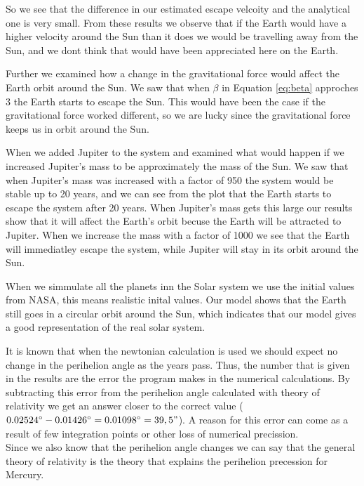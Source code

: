 \documentclass{article}
\begin{document}
So we see that the difference in our estimated escape velcoity and the analytical one is very small. From these results we observe that if the Earth would have a higher velocity around the Sun than it does we would be travelling away from the Sun, and we dont think that would have been appreciated here on the Earth.

Further we examined how a change in the gravitational force would affect the Earth orbit around the Sun. We saw that when $\beta$ in Equation \ref{eq:beta} approches 3 the Earth starts to escape the Sun. This would have been the case if the gravitational force worked different, so we are lucky since the gravitational force keeps us in orbit around the Sun.

When we added Jupiter to the system and examined what would happen if we increased Jupiter's mass to be approximately the mass of the Sun. We saw that when Jupiter's mass was increased with a factor of 950 the system would be stable up to 20 years, and we can see from the plot that the Earth starts to escape the system after 20 years. When Jupiter's mass gets this large our results show that it will affect the Earth's orbit becuse the Earth will be attracted to Jupiter. When we increase the mass with a factor of 1000 we see that the Earth will immediatley escape the system, while Jupiter will stay in its orbit around the Sun.

When we simmulate all the planets inn the Solar system we use the initial values from NASA, this means realistic inital values. Our model shows that the Earth still goes in a circular orbit around the Sun, which indicates that our model gives a good representation of the real solar system.

It is known that when the newtonian calculation is used we should expect no change in the perihelion angle as the years pass. Thus, the number that is given in the results are the error the program makes in the numerical calculations. By subtracting this error from the perihelion angle calculated with theory of relativity we get an answer closer to the correct value ($0.02524^\circ - 0.01426^\circ = 0.01098^\circ = 39,5" $). A reason for this error can come as a result of few integration points or other loss of numerical precission. \\
Since we also know that the perihelion angle changes we can say that the general theory of relativity is the theory that explains the perihelion precession for Mercury.
\end{document}
